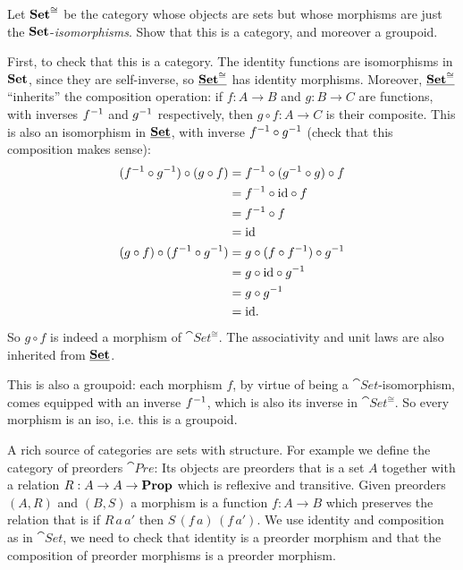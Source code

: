 \begin{Exercise}
  Let $\mathbf{Set}^{\cong}$ be the category whose objects are sets but whose morphisms are just the $\mathbf{Set}$-\emph{isomorphisms}. Show that this is a category, and moreover a groupoid. 
\end{Exercise}
\begin{Answer}
  First, to check that this is a category. The identity functions are isomorphisms in $\mathbf{Set}$, since they are self-inverse, so $\underline{\mathbf{\mathbf{Set}^{\cong}}}$ has identity morphisms. Moreover, $\underline{\mathbf{\mathbf{Set}^{\cong}}}$ ``inherits'' the composition operation: if $f\colon A\to B$ and $g\colon B\to C$ are functions, with inverses $f^{-1}$ and $g^{-1}$ respectively, then $g\circ f : A \to C$ is their composite. This is also an isomorphism in $\underline{\mathbf{\mathbf{Set}}}$, with inverse $f^{-1}\circ g^{-1}$ (check that this composition makes sense):
  \begin{align*}
    (f^{-1}\circ g^{-1})\circ (g\circ f) 
      &= f^{-1} \circ (g^{-1}\circ g)\circ f\\ 
      &= f^{-1} \circ \mathrm{id}\circ f \\
      &= f^{-1} \circ f \\
      &= \mathrm{id}\\
    (g\circ f)\circ (f^{-1}\circ g^{-1})
      &= g\circ (f\circ f^{-1})\circ g^{-1}\\
      &= g\circ \mathrm{id} \circ g^{-1}\\
      &= g\circ g^{-1}\\
      &= \mathrm{id}.
  \end{align*}
  So $g\circ f$ is indeed a morphism of $\cat{Set^{\cong}}$. The associativity and unit laws are also inherited from $\underline{\mathbf{\mathbf{Set}}}$.

  This is also a groupoid: each morphism $f$, by virtue of being a $\cat{Set}$-isomorphism, comes equipped with an inverse $f^{-1}$, which is also its inverse in $\cat{Set^{\cong}}$. So every morphism is an iso, i.e. this is a groupoid.
\end{Answer}

A rich source of categories are sets with structure. For example we define the category of preorders $\cat{Pre}$: Its objects are preorders that is a set $A$ together with a relation $R : A \to A \to \mathbf{Prop}$ which is reflexive and transitive. Given preorders $(A,R)$ and $(B,S)$ a morphism is a function $f : A \to B$ which preserves the relation that is if $R\,a\,a'$ then $S\,(f\,a)\,(f\,a')$. We use identity and composition as in $\cat{Set}$, we need to check that identity is a preorder morphism and that the composition of preorder morphisms is a preorder morphism.

